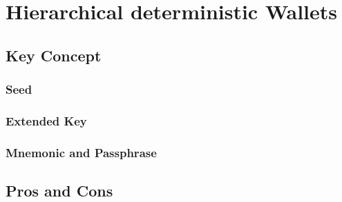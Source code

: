 \section{Hierarchical deterministic Wallets}

\subsection{Key Concept}

\subsubsection{Seed}

\subsubsection{Extended Key}

\subsubsection{Mnemonic and Passphrase}

\subsection{Pros and Cons}

